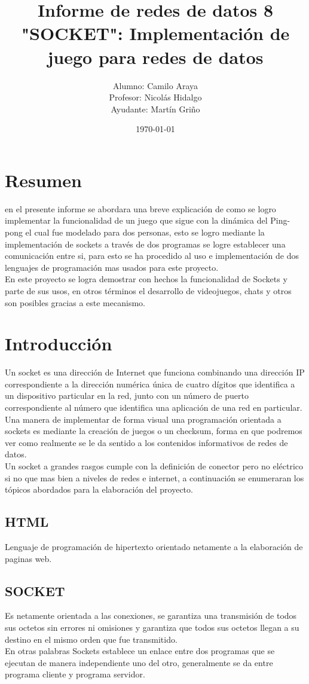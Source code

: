 \documentclass[spanish]{udpreport}
\title{Informe de redes de datos 8\\
"SOCKET": Implementación de juego para redes de datos\\}
\author{Alumno: Camilo Araya
\\Profesor: Nicolás Hidalgo\\Ayudante: Martín Griño}
\date{\today}
\begin{document}
\maketitle

\chapter*{Resumen} 
en el presente informe se abordara una breve explicación de como se logro implementar la 
funcionalidad de un juego que sigue con la dinámica del  Ping-pong el cual 
fue modelado para dos personas, esto se logro 
 mediante la implementación de sockets a través de dos
programas se logre establecer una comunicación entre si, para esto se ha procedido al uso e
implementación de dos lenguajes de programación mas usados para este proyecto.
\\En este proyecto se logra demostrar con hechos la funcionalidad de Sockets y parte de sus usos, en otros términos el desarrollo de videojuegos, chats y otros son posibles gracias a este mecanismo.
\tableofcontents
\chapter{Introducción}
Un socket es una dirección de Internet que funciona combinando una dirección IP correspondiente
 a la dirección numérica única de cuatro dígitos que identifica a un dispositivo particular 
en la red, junto con un número de puerto correspondiente al número que identifica
 una aplicación de una red en particular.
 \\[0.2cm]
Una manera de implementar de forma visual una programación orientada a sockets es mediante la 
creación de juegos o un checksum, forma en que podremos ver como realmente se le da sentido 
a  los contenidos informativos de redes de datos.
\\[0.2cm]
Un socket a grandes rasgos  cumple con la definición de conector pero no eléctrico si no que mas
bien a niveles de redes e internet, a continuación se enumeraran los tópicos abordados para la elaboración del proyecto.
\\[0.2cm]
\section{HTML}
 Lenguaje de programación de hipertexto orientado netamente a la elaboración de paginas web.
\\[0.2cm]
\section{SOCKET}
 Es netamente orientada a las conexiones, se garantiza una transmisión
de todos sus octetos sin errores ni omisiones y garantiza que todos sus octetos
llegan a su destino en el mismo orden que fue transmitido.
\\En otras palabras Sockets establece un enlace entre dos programas que se ejecutan de manera independiente uno del otro, generalmente se da entre programa cliente y programa servidor.
\\[0.2cm]
\end{document}
